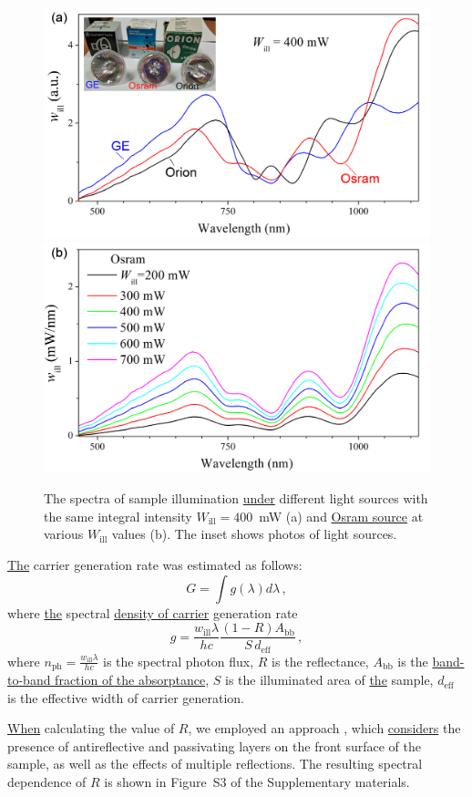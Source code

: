 \documentclass{WileyMSP-template}
\begin{document}
\begin{figure}
\centering
  \includegraphics[width=0.4\linewidth]{Fig4a.png}
  \includegraphics[width=0.4\linewidth]{Fig4b.png}
  \caption{
  The spectra of sample illumination \textcolor[rgb]{0.00,0.07,1.00}{\uline{under}} different light sources with the same integral intensity $W_\mathrm{ill}=400$~mW (a) 
  and \textcolor[rgb]{0.00,0.07,1.00}{\uline{Osram source}} at various $W_\mathrm{ill}$ values (b).
 The inset shows photos of light sources.
}
  \label{fig4}
\end{figure}


\textcolor[rgb]{0.00,0.07,1.00}{\uline{The}} carrier generation rate was estimated as follows:
\begin{equation}
\label{eqGint}
G=\int g(\lambda) d\lambda\,,
\end{equation}
where \textcolor[rgb]{0.00,0.07,1.00}{\uline{the}} spectral \textcolor[rgb]{0.00,0.07,1.00}{\uline{density of carrier}} generation rate
\begin{equation}
\label{eqGspectr}
g=\frac{w_\mathrm{ill}\lambda}{hc}\frac{(1-R)A_\mathrm{bb}}{S\,d_\mathrm{eff}}\,,
\end{equation}
where $n_\mathrm{ph}=\frac{w_\mathrm{ill}\lambda}{hc}$ is the spectral photon flux,
$R$ is the reflectance,
$A_\mathrm{bb}$ is the \textcolor[rgb]{0.00,0.07,1.00}{\uline{band-to-band fraction of the absorptance}},
$S$ is the illuminated area of \textcolor[rgb]{0.00,0.07,1.00}{\uline{the}} sample,
$d_\mathrm{eff}$ is the effective width of carrier generation.

\textcolor[rgb]{0.00,0.07,1.00}{\uline{When}} calculating the value of $R$, we employed an approach \cite{KostRefl2000},
which \textcolor[rgb]{0.00,0.07,1.00}{\uline{considers}} the presence of antireflective and passivating layers on the front surface of the sample,
as well as the effects of multiple reflections.
The resulting spectral dependence of $R$ is shown in Figure~S3 of the Supplementary materials.
\end{document}

